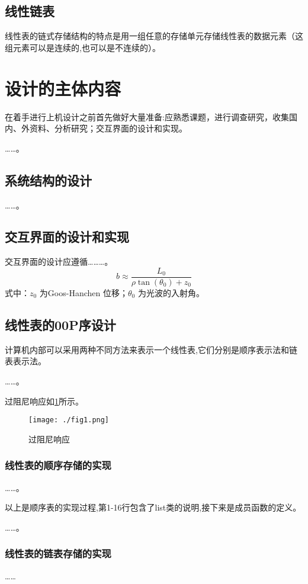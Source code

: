 \documentclass{upcthesis}
\begin{document}
\subsection{线性链表}
	线性表的链式存储结构的特点是用一组任意的存储单元存储线性表的数据元素（这组元素可以是连续的,也可以是不连续的）。

\section{设计的主体内容}
在着手进行上机设计之前首先做好大量准备:应熟悉课题，进行调查研究，收集国内、外资料、分析研究；交互界面的设计和实现。

……。
\subsection{系统结构的设计}
	……。
\subsection{交互界面的设计和实现}
	交互界面的设计应遵循………。
	\begin{equation}
		b \approx \frac{L_0}{\rho\tan(\theta_0) + z_0}
	\end{equation}
式中：$z_0$ 为Goos-Hanchen 位移；$\theta_0$ 为光波的入射角。
\subsection{线性表的00P序设计}
	计算机内部可以采用两种不同方法来表示一个线性表,它们分别是顺序表示法和链表表示法。
	
	……。
	
	过阻尼响应如\ref{fig:fig1}所示。
	\begin{figure}[htbp]
		\centering
		\texttt{[image: ./fig1.png]}
		\caption{过阻尼响应}
		\label{fig:fig1}
	\end{figure}

\subsubsection{线性表的顺序存储的实现}
……。

以上是顺序表的实现过程,第1-16行包含了list类的说明,接下来是成员函数的定义。

……。

\subsubsection{线性表的链表存储的实现}
……
\end{document}
